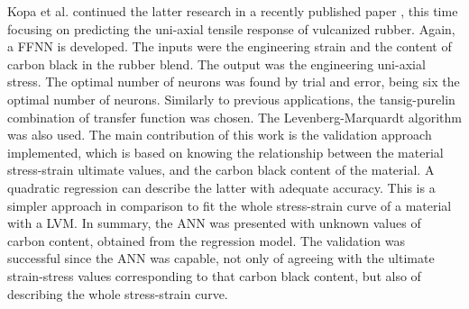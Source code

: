 Kopa et al. continued the latter research in a recently published paper \cite{kopal2018prediction}, this time focusing on predicting the uni-axial tensile response of vulcanized rubber. Again, a FFNN is developed. The inputs were the engineering strain and the content of carbon black in the rubber blend. The output was the engineering uni-axial stress. The optimal number of neurons was found by trial and error, being six the optimal number of neurons. Similarly to previous applications, the tansig-purelin combination of transfer function was chosen. The Levenberg-Marquardt algorithm was also used. The main contribution of this work is the validation approach implemented, which is based on knowing the relationship between the material stress-strain ultimate values, and the carbon black content of the material. A quadratic regression can describe the latter with adequate accuracy. This is a simpler approach in comparison to fit the whole stress-strain curve of a material with a LVM. In summary, the ANN was presented with unknown values of carbon content, obtained from the regression model. The validation was successful since the ANN was capable, not only of agreeing with the ultimate strain-stress values corresponding to that carbon black content, but also of describing the whole stress-strain curve.

